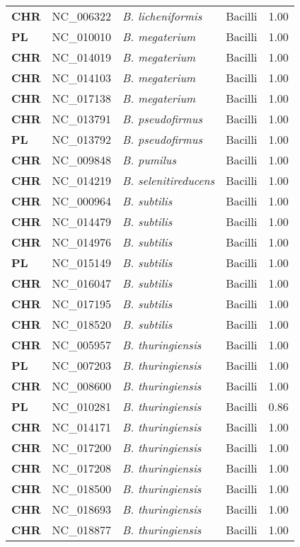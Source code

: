 \begin{adjustwidth}{-3cm}{2cm}
{\begin{supertabular}{>{\bfseries}l|p{0.1\textwidth}p{0.14\textwidth}l|l}
CHR & NC\_006322 & \textit{B. licheniformis} & Bacilli & 1.00\\
PL & NC\_010010 & \textit{B. megaterium} & Bacilli & 1.00\\
CHR & NC\_014019 & \textit{B. megaterium} & Bacilli & 1.00\\
CHR & NC\_014103 & \textit{B. megaterium} & Bacilli & 1.00\\
CHR & NC\_017138 & \textit{B. megaterium} & Bacilli & 1.00\\
CHR & NC\_013791 & \textit{B. pseudofirmus} & Bacilli & 1.00\\
PL & NC\_013792 & \textit{B. pseudofirmus} & Bacilli & 1.00\\
CHR & NC\_009848 & \textit{B. pumilus} & Bacilli & 1.00\\
CHR & NC\_014219 & \textit{B. selenitireducens} & Bacilli & 1.00\\
CHR & NC\_000964 & \textit{B. subtilis} & Bacilli & 1.00\\
CHR & NC\_014479 & \textit{B. subtilis} & Bacilli & 1.00\\
CHR & NC\_014976 & \textit{B. subtilis} & Bacilli & 1.00\\
PL & NC\_015149 & \textit{B. subtilis} & Bacilli & 1.00\\
CHR & NC\_016047 & \textit{B. subtilis} & Bacilli & 1.00\\
CHR & NC\_017195 & \textit{B. subtilis} & Bacilli & 1.00\\
CHR & NC\_018520 & \textit{B. subtilis} & Bacilli & 1.00\\
CHR & NC\_005957 & \textit{B. thuringiensis} & Bacilli & 1.00\\
PL & NC\_007203 & \textit{B. thuringiensis} & Bacilli & 1.00\\
CHR & NC\_008600 & \textit{B. thuringiensis} & Bacilli & 1.00\\
PL & NC\_010281 & \textit{B. thuringiensis} & Bacilli & 0.86\\
CHR & NC\_014171 & \textit{B. thuringiensis} & Bacilli & 1.00\\
CHR & NC\_017200 & \textit{B. thuringiensis} & Bacilli & 1.00\\
CHR & NC\_017208 & \textit{B. thuringiensis} & Bacilli & 1.00\\
CHR & NC\_018500 & \textit{B. thuringiensis} & Bacilli & 1.00\\
CHR & NC\_018693 & \textit{B. thuringiensis} & Bacilli & 1.00\\
CHR & NC\_018877 & \textit{B. thuringiensis} & Bacilli & 1.00\\

\end{supertabular}}
\end{adjustwidth}
